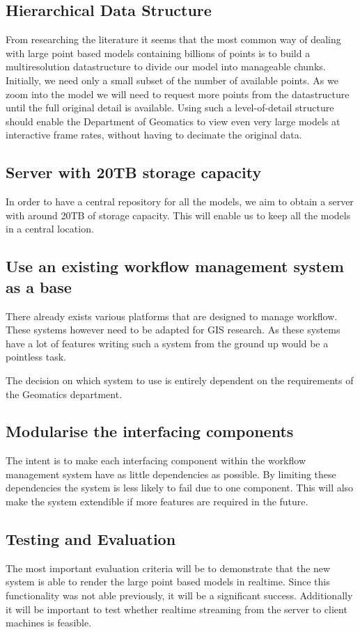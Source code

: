 \documentclass[12pt,a4paper]{article}
\begin{document}
\subsection{Hierarchical Data Structure}
From researching the literature it seems that the most common way of dealing
with large point based models containing billions of points is to build a
multiresolution datastructure to divide our model into manageable chunks.
Initially, we need only a small subset of the number of available points.
As we zoom into the model we will need to request more points from the
datastructure until the full original detail is available. Using such a
level-of-detail structure should enable the Department of Geomatics to
view even very large models at interactive frame rates, without having
to decimate the original data.
\subsection{Server with 20TB storage capacity}
In order to have a central repository for all the models, we aim to obtain a server
with around 20TB of storage capacity. This will enable us to keep all the models in
a central location.
\subsection{Use an existing workflow management system as a base}
There already exists various platforms that are designed to manage workflow. These
systems however need to be adapted for GIS research. As these systems have a lot of
features writing such a system from the ground up would be a pointless task.

The decision on which system to use is entirely dependent on the requirements
of the Geomatics department.
\subsection{Modularise the interfacing components}
The intent is to make each interfacing component within the workflow management system
have as little dependencies as possible. By limiting these dependencies
the system is less likely to fail due to one component. This will also make
the system extendible if more features are required in the future.

\subsection{Testing and Evaluation}
The most important evaluation criteria will be to demonstrate that the new
system is able to render the large point based models in realtime. Since this
functionality was not able previously, it will be a significant success.
Additionally it will be important to test whether realtime streaming from the
server to client machines is feasible.
\end{document}
